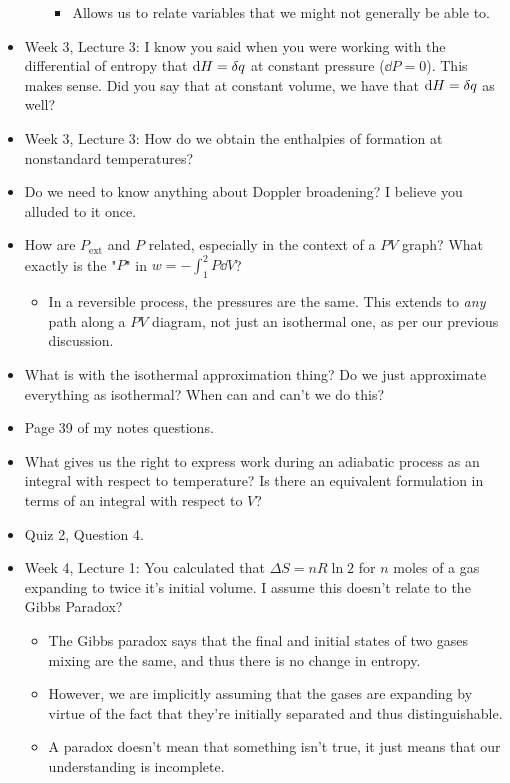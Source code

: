 \documentclass[../notes.tex]{subfiles}
\begin{document}
\begin{itemize}
\begin{itemize}
\begin{itemize}
            \item Allows us to relate variables that we might not generally be able to.
        \end{itemize}
    \end{itemize}
    \item Week 3, Lecture 3: I know you said when you were working with the differential of entropy that $\dd{H}=\var{q}$ at constant pressure ($\dd{P}=0$). This makes sense. Did you say that at constant volume, we have that $\dd{H}=\var{q}$ as well?
    \item Week 3, Lecture 3: How do we obtain the enthalpies of formation at nonstandard temperatures?
    \item Do we need to know anything about Doppler broadening? I believe you alluded to it once.
    \item How are $P_\text{ext}$ and $P$ related, especially in the context of a $PV$ graph? What exactly is the "$P$" in $w=-\int_1^2P\dd{V}$?
    \begin{itemize}
        \item In a reversible process, the pressures are the same. This extends to \emph{any} path along a $PV$ diagram, not just an isothermal one, as per our previous discussion.
    \end{itemize}
    \item What is with the isothermal approximation thing? Do we just approximate everything as isothermal? When can and can't we do this?
    \item Page 39 of my notes questions.
    \item What gives us the right to express work during an adiabatic process as an integral with respect to temperature? Is there an equivalent formulation in terms of an integral with respect to $V$?
    \item Quiz 2, Question 4.
    \item Week 4, Lecture 1: You calculated that $\Delta S=nR\ln 2$ for $n$ moles of a gas expanding to twice it's initial volume. I assume this doesn't relate to the Gibbs Paradox?
    \begin{itemize}
        \item The Gibbs paradox says that the final and initial states of two gases mixing are the same, and thus there is no change in entropy.
        \item However, we are implicitly assuming that the gases are expanding by virtue of the fact that they're initially separated and thus distinguishable.
        \item A paradox doesn't mean that something isn't true, it just means that our understanding is incomplete.

\end{itemize}
\end{itemize}
\end{document}
